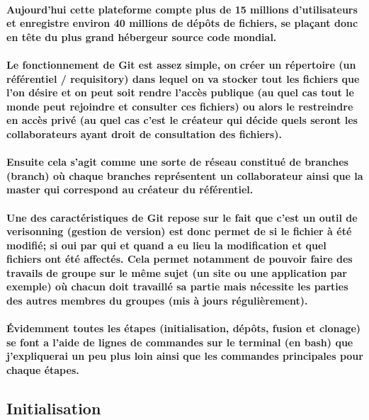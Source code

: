 \documentclass[a4paper, 12pt, twoside]{article}
\begin{document}
\paragraph{Aujourd'hui cette plateforme compte plus de 15 millions d'utilisateurs et enregistre environ 40 millions de dépôts de fichiers,
se plaçant donc en tête du plus grand hébergeur source code mondial.}

\paragraph{Le fonctionnement de Git est assez simple, on créer un répertoire (un référentiel / requisitory) dans lequel on va stocker tout les fichiers que l'on désire et on peut soit rendre l'accès publique (au quel cas tout le monde peut rejoindre et consulter ces fichiers) ou alors le  restreindre en accès privé (au quel cas c'est le créateur qui décide quels seront les collaborateurs ayant droit de consultation des fichiers).}
\paragraph{Ensuite cela s'agit comme une sorte de réseau constitué de branches (branch) où chaque branches représentent un collaborateur ainsi que la master qui correspond au créateur du référentiel.}

\paragraph{Une des caractéristiques de Git repose sur le fait que c'est un outil de verisonning (gestion de version) est donc permet de si le fichier
à été modifié; si oui par qui et quand a eu lieu la modification et quel fichiers ont été affectés. Cela permet notamment de pouvoir faire
des travails de groupe sur le même sujet (un site ou une application par exemple) où chacun doit travaillé sa partie mais nécessite les parties 
des autres membres du groupes (mis à jours régulièrement). }

\paragraph{Évidemment toutes les étapes (initialisation, dépôts, fusion et clonage) se font a l'aide de lignes de commandes sur le terminal (en bash) que j'expliquerai un peu plus loin ainsi que les commandes principales pour chaque étapes.}

\subsection{Initialisation}
\end{document}
